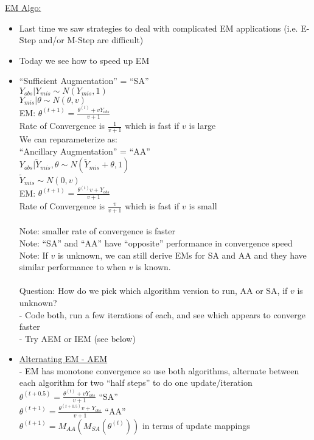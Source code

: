 \documentclass[a4paper, 11pt]{report}
\newcommand{\tab}{\hspace*{1.0em}} %
\newcommand{\yo}{Y_{obs}}
\newcommand{\ym}{Y_{mis}}
\newcommand{\yt}{\widetilde{Y}_{mis}}
\newcommand{\tht}{\theta^{(t)}}
\newcommand{\thf}{\theta^{(t+0.5)}}
\newcommand{\tho}{\theta^{(t+1)}}
\begin{document}
\noindent
\underline{EM Algo:}
\begin{itemize}

	\item Last time we saw strategies to deal with complicated EM applications (i.e. E-Step and/or M-Step are difficult)
	
	\item Today we see how to speed up EM
	
	\item ``Sufficient Augmentation'' = ``SA'' \\
		$\yo \vert \ym \sim N(\ym,1)$ \\
		$\ym \vert \theta \sim N(\theta,v)$ \\
		EM: \tab $\tho = \frac{\tht+v\yo}{v+1}$ \\
		Rate of Convergence is $\frac{1}{v+1}$ which is fast if $v$ is large \\ 
		
		We can reparameterize as: \\
		``Ancillary Augmentation'' = ``AA'' \\
		$\yo \vert \yt,\theta \sim N(\yt+\theta,1)$ \\
		$\yt \sim N(0,v)$ \\		
		EM: \tab $\tho = \frac{\tht v +\yo}{v+1}$ \\
		Rate of Convergence is $\frac{v}{v+1}$ which is fast if $v$ is small \\ \\
		Note: smaller rate of convergence is faster \\
		Note: ``SA'' and ``AA'' have ``opposite'' performance in convergence speed \\ 
		Note: If $v$ is unknown, we can still derive EMs for SA and AA and they have similar performance to when $v$ is known. \\ \\
		Question: How do we pick which algorithm version to run, AA or SA, if $v$ is unknown? \\
		- Code both, run a few iterations of each, and see which appears to converge faster \\
		- Try AEM or IEM (see below)

	\item \underline{Alternating EM - AEM} \\
		- EM has monotone convergence so use both algorithms, alternate between each algorithm for two ``half steps'' to do one update/iteration \\
		$\thf = \frac{\tht+v\yo}{v+1}$ \tab ``SA'' \\
		$\tho = \frac{\thf{}v+\yo}{v+1}$ \tab ``AA'' \\		
		$\tho = M_{AA}(M_{SA}(\tht))$ \tab in terms of update mappings \\ 
		

\end{itemize}
\end{document}
